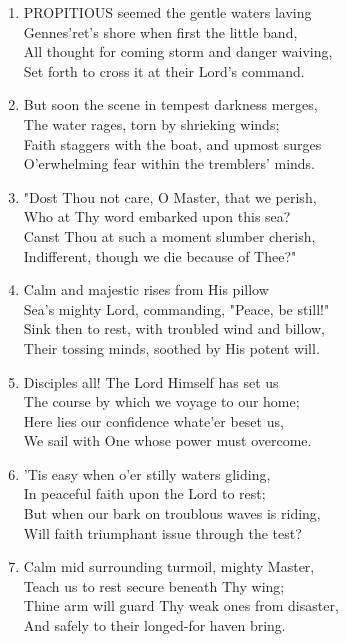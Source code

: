 \begin{enumerate}
    \item PROPITIOUS seemed the gentle waters laving \\
            Gennes'ret's shore when first the little band, \\
        All thought for coming storm and danger waiving, \\
            Set forth to cross it at their Lord's command.

    \item But soon the scene in tempest darkness merges, \\
            The water rages, torn by shrieking winds; \\
        Faith staggers with the boat, and upmost surges \\
            O'erwhelming fear within the tremblers' minds.

    \item "Dost Thou not care, O Master, that we perish, \\
            Who at Thy word embarked upon this sea? \\
        Canst Thou at such a moment slumber cherish, \\
            Indifferent, though we die because of Thee?"

    \item Calm and majestic rises from His pillow \\
            Sea's mighty Lord, commanding, "Peace, be still!" \\
        Sink then to rest, with troubled wind and billow, \\
            Their tossing minds, soothed by His potent will.

    \item Disciples all! The Lord Himself has set us \\
            The course by which we voyage to our home; \\
        Here lies our confidence whate'er beset us, \\
            We sail with One whose power must overcome.

    \item 'Tis easy when o'er stilly waters gliding, \\
            In peaceful faith upon the Lord to rest; \\
        But when our bark on troublous waves is riding, \\
            Will faith triumphant issue through the test?

    \item Calm mid surrounding turmoil, mighty Master, \\
            Teach us to rest secure beneath Thy wing; \\
        Thine arm will guard Thy weak ones from disaster, \\
            And safely to their longed-for haven bring.

\end{enumerate}

